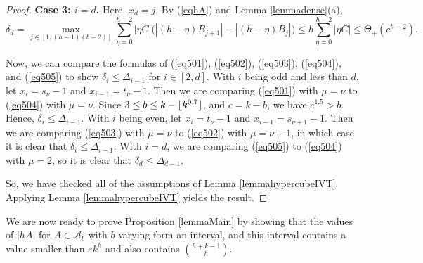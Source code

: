 \documentclass{daj}
\theoremstyle{definition}
\theoremstyle{remark}
\numberwithin{equation}{section}
\numberwithin{theorem}{section}
\newcommand{\cala}{\mathcal{A}}
\DeclarePairedDelimiter{\floor}{\lfloor}{\rfloor}
\begin{document}
\begin{proof}
    \textbf{Case 3: $i = d$.} Here, $x_d = j$. By (\ref{eqhA}) and Lemma \ref{lemmadense}(a), \begin{equation}\label{eq505}
        \delta_d = \max_{j \in [1,(h-1)(b-2)]} \sum_{\eta = 0}^{h-2} |\eta C|\big(|(h-\eta)B_{j+1}|-|(h-\eta)B_{j}|\big) \leq h \sum_{\eta = 0}^{h-2} |\eta C| \leq \Theta_+(c^{h-2}).
    \end{equation}

    Now, we can compare the formulas of (\ref{eq501}), (\ref{eq502}), (\ref{eq503}), (\ref{eq504}), and (\ref{eq505}) to show $\delta_i \leq \Delta_{i-1}$ for $i \in [2,d]$. With $i$ being odd and less than $d$, let $x_i = s_{\nu}-1$ and $x_{i-1} = t_{\nu}-1$. Then we are comparing (\ref{eq501}) with $\mu = \nu$ to (\ref{eq504}) with $\mu = \nu$. Since $3 \leq b \leq k-\floor{k^{0.7}}$, and $c = k-b$, we have $c^{1.5} > b$. Hence, $\delta_i \leq \Delta_{i-1}$. With $i$ being even, let $x_i = t_{\nu}-1$ and $x_{i-1} = s_{\nu+1}-1$. Then we are comparing (\ref{eq503}) with $\mu=\nu$ to (\ref{eq502}) with $\mu = \nu+1$, in which case it is clear that $ \delta_i \leq \Delta_{i-1}$. With $i = d$, we are comparing (\ref{eq505}) to (\ref{eq504}) with $\mu = 2$, so it is clear that $ \delta_d \leq \Delta_{d-1}$. 

    So, we have checked all of the assumptions of Lemma \ref{lemmahypercubeIVT}. Applying Lemma \ref{lemmahypercubeIVT} yields the result.
\end{proof}

We are now ready to prove Proposition \ref{lemmaMain} by showing that the values of $|hA|$ for $A \in \cala_b$ with $b$ varying form an interval, and this interval contains a value smaller than $\varepsilon k^h$ and also contains $\binom{h+k-1}{h}$.
\end{document}
